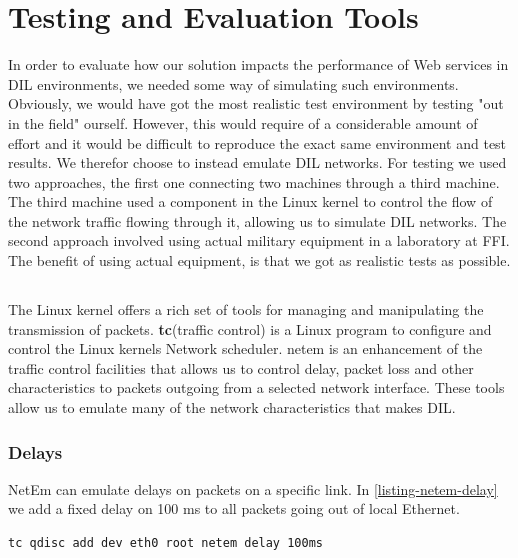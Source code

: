 \section{Testing and Evaluation Tools}

In order to evaluate how our solution impacts the performance of Web services in
DIL environments, we needed some way of simulating such environments. Obviously,
we would have got the most realistic test environment by testing "out in the
field" ourself. However, this would require of a considerable amount of effort
and it would be difficult to reproduce the exact same environment and test
results. We therefor choose to instead emulate DIL networks. For testing we used
two approaches, the first one connecting two machines through a third machine.
The third machine used a component in the Linux kernel to control the flow
of the network traffic flowing through it, allowing us to simulate DIL networks.
The second approach involved using actual military equipment in a laboratory at
FFI. The benefit of using actual equipment, is that we got as realistic tests as
possible.


\subsection{}

The Linux kernel offers a rich set of tools for managing and manipulating the
transmission of packets. \textbf{tc}(traffic control) is a Linux program to
configure and control the Linux kernels Network scheduler. \gls{netem} is an
enhancement of the traffic control facilities that allows us to control delay,
packet loss and other characteristics to packets outgoing from a selected
network interface\cite{man-netem}. These tools allow us to emulate many of the network
characteristics that makes DIL.


\subsubsection{Delays}

NetEm can emulate delays on packets on a specific link. In
\cref{listing-netem-delay} we add a fixed delay on 100 ms to all packets going
out of local Ethernet.

\begin{lstlisting}[frame=single, caption="Emulating delay", label=listing-netem-delay]
  tc qdisc add dev eth0 root netem delay 100ms
\end{lstlisting}

